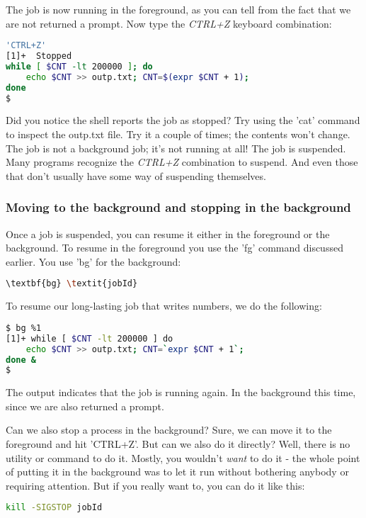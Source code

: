 The job is now running in the foreground, as you can tell from the fact that we
are not returned a prompt. Now type the \textit{CTRL+Z} keyboard combination:

\lstset{basicstyle=\scriptsize, numbers=left, captionpos=b, tabsize=4}
\begin{lstlisting}[caption=Stopping the job,language={bash},
xleftmargin=15pt, label=lst:Stopping the job]
'CTRL+Z'
[1]+  Stopped 
while [ $CNT -lt 200000 ]; do
    echo $CNT >> outp.txt; CNT=$(expr $CNT + 1);
done
$
\end{lstlisting}

Did you notice the shell reports the job as stopped? Try using the 'cat'
command to inspect the outp.txt file. Try it a couple of times; the contents
won't change. The job is not a background job; it's not running at all! The job
is suspended. Many programs recognize the \textit{CTRL+Z} combination to suspend.
And even those that don't usually have some way of suspending themselves.

\subsubsection{Moving to the background and stopping in the background}
Once a job is suspended, you can resume it either in the foreground or the
background. To resume in the foreground you use the 'fg' command discussed
earlier. You use 'bg' for the background:

\lstset{basicstyle=\scriptsize, numbers=left, captionpos=b, tabsize=4}
\begin{lstlisting}[language={bash},
xleftmargin=15pt]
\textbf{bg} \textit{jobId}
\end{lstlisting}

To resume our long-lasting job that writes numbers, we do the following:

\lstset{basicstyle=\scriptsize, numbers=left, captionpos=b, tabsize=4}
\begin{lstlisting}[caption=Resuming the job in the background,language={bash},
xleftmargin=15pt, label=lst:Resuming the job in the background]
$ bg %1
[1]+ while [ $CNT -lt 200000 ] do
    echo $CNT >> outp.txt; CNT=`expr $CNT + 1`;
done &
$
\end{lstlisting}


The output indicates that the job is running again. In the background this
time, since we are also returned a prompt.

Can we also stop a process in the background? Sure, we can move it to the
foreground and hit 'CTRL+Z'. But can we also do it directly? Well, there is no
utility or command to do it. Mostly, you wouldn't \textit{want} to do it - the
whole point of putting it in the background was to let it run without bothering
anybody or requiring attention. But if you really want to, you can do it like
this:
\lstset{basicstyle=\scriptsize, numbers=left, captionpos=b, tabsize=4}
\begin{lstlisting}[language={bash},
xleftmargin=15pt]
kill -SIGSTOP jobId
\end{lstlisting}

